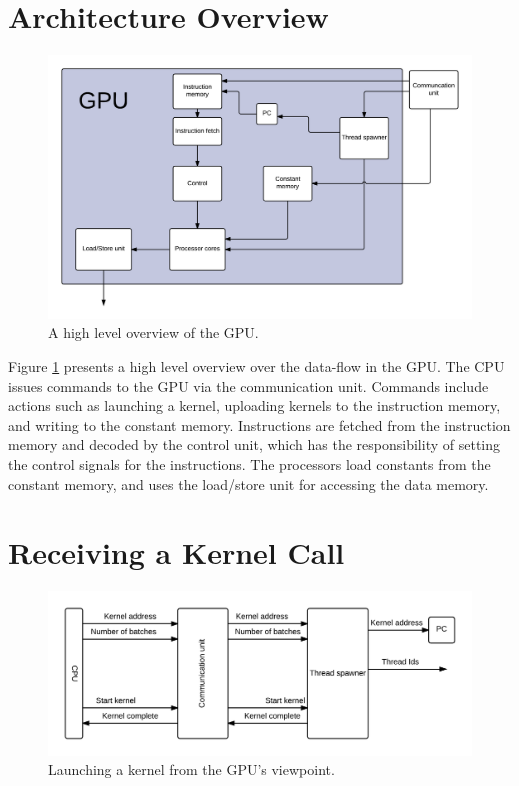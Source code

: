\documentclass[../main/report.tex]{subfiles}
\begin{document}
\section{Architecture Overview}
\begin{figure}[H]
\centering
\includegraphics[width=\textwidth]{../gpu/diagrams/architecture_overview.png}
\caption{A high level overview of the GPU.}
\label{fig:architecture_overview}
\end{figure}
Figure \ref{fig:architecture_overview} presents a high level overview over the data-flow in the GPU.
The CPU issues commands to the GPU via the communication unit. Commands include actions such as launching a kernel, uploading kernels to the instruction memory, and writing to the constant memory.
Instructions are fetched from the instruction memory and decoded by the control unit, which has the responsibility of setting the control signals for the instructions.
The processors load constants from the constant memory, and uses the load/store unit for accessing the data memory.


\section{Receiving a Kernel Call}
\begin{figure}[H]
\centering
\includegraphics[width=\textwidth]{../gpu/diagrams/receiving_a_kernel_call.png}
\caption{Launching a kernel from the GPU's viewpoint.}
\label{fig:kernel_call}
\end{figure}
\end{document}
